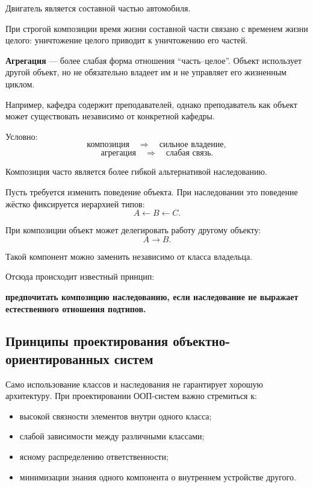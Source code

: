 Двигатель является составной частью автомобиля.

При строгой композиции время жизни составной части связано с временем жизни целого: уничтожение целого приводит к уничтожению его частей.

\textbf{Агрегация} --- более слабая форма отношения ``часть--целое''. Объект использует другой объект, но не обязательно владеет им и не управляет его жизненным циклом.

Например, кафедра содержит преподавателей, однако преподаватель как объект может существовать независимо от конкретной кафедры.

Условно:
\[
\text{композиция}
\quad\Rightarrow\quad
\text{сильное владение},
\]
\[
\text{агрегация}
\quad\Rightarrow\quad
\text{слабая связь}.
\]

Композиция часто является более гибкой альтернативой наследованию.

Пусть требуется изменить поведение объекта. При наследовании это поведение жёстко фиксируется иерархией типов:
\[
A \leftarrow B \leftarrow C.
\]

При композиции объект может делегировать работу другому объекту:
\[
A \longrightarrow B.
\]

Такой компонент можно заменить независимо от класса владельца.

Отсюда происходит известный принцип:
\begin{center}
	\textbf{предпочитать композицию наследованию, если наследование не выражает естественного отношения подтипов.}
\end{center}

\subsection{Принципы проектирования объектно-ориентированных систем}

Само использование классов и наследования не гарантирует хорошую архитектуру. При проектировании ООП-систем важно стремиться к:
\begin{itemize}
	\item высокой связности элементов внутри одного класса;
	\item слабой зависимости между различными классами;
	\item ясному распределению ответственности;
	\item минимизации знания одного компонента о внутреннем устройстве другого.
\end{itemize}

